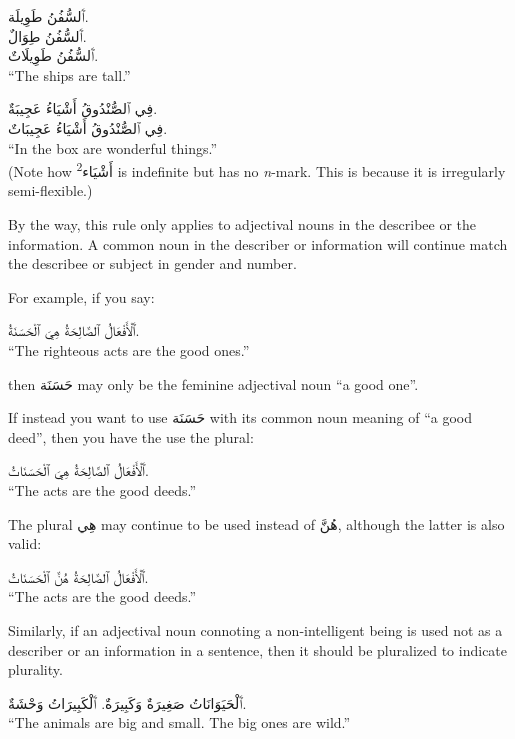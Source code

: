 \documentclass[
  10pt,
]{book}
\begin{document}
\foreignlanguage{arabic}{ٱَلسُّفُنُ طَوِيلَة.}\\
\foreignlanguage{arabic}{ٱَلسُّفُنُ طِوَالٌ.}\\
\foreignlanguage{arabic}{ٱَلسُّفُنُ طَوِيلَاتٌ.}\\
\enquote{The ships are tall.}

\foreignlanguage{arabic}{فِي ٱلصُّنْدُوقُ أَشْيَاءُ عَجِيبَةٌ.}\\
\foreignlanguage{arabic}{فِي ٱلصُّنْدُوقُ أَشْيَاءُ عَجِيبَاتٌ.}\\
\enquote{In the box are wonderful things.}\\
(Note how \foreignlanguage{arabic}{أَشْيَاء\textsuperscript{2}} is indefinite but has no \emph{n}-mark. This is because it is irregularly semi-flexible.)

By the way, this rule only applies to adjectival nouns in the describee or the information. A common noun in the describer or information will continue match the describee or subject in gender and number.

For example, if you say:

\foreignlanguage{arabic}{ٱَلْأَفْعَالُ ٱلصَّالِحَةُ هِيَ ٱلْحَسَنَةُ.}\\
\enquote{The righteous acts are the good ones.}

then \foreignlanguage{arabic}{حَسَنَة} may only be the feminine adjectival noun \enquote{a good one}.

If instead you want to use \foreignlanguage{arabic}{حَسَنَة} with its common noun meaning of \enquote{a good deed}, then you have the use the plural:

\foreignlanguage{arabic}{ٱَلْأَفْعَالُ ٱلصَّالِحَةُ هِيَ ٱلْحَسَنَاتُ.}\\
\enquote{The acts are the good deeds.}

The plural \foreignlanguage{arabic}{هِي} may continue to be used instead of \foreignlanguage{arabic}{هُنَّ}, although the latter is also valid:

\foreignlanguage{arabic}{ٱَلْأَفْعَالُ ٱلصَّالِحَةُ هُنَّ ٱلْحَسَنَاتُ.}\\
\enquote{The acts are the good deeds.}

Similarly, if an adjectival noun connoting a non-intelligent being is used not as a describer or an information in a sentence, then it should be pluralized to indicate plurality.

\foreignlanguage{arabic}{ٱَلْحَيَوَانَاتُ صَغِيرَةٌ وَکَبِيرَةٌ. ٱَلْکَبِيرَاتُ وَحْشَةٌ.}\\
\enquote{The animals are big and small. The big ones are wild.}
\end{document}
